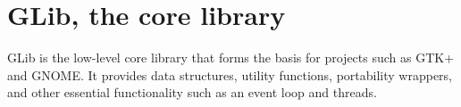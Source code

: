 \chapter{GLib, the core library}

GLib is the low-level core library that forms the basis for projects such as GTK+ and GNOME. It provides data structures, utility functions, portability wrappers, and other essential functionality such as an event loop and threads.

